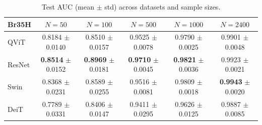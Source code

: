 \begin{table}[htbp]
\centering
\caption{Test AUC (mean $\pm$ std) across datasets and sample sizes.}
\label{tab:test_auc}
\begin{tabular}{lccccc}
\toprule
\textbf{Br35H} & $N = 50$ & $N = 100$ & $N = 500$ & $N = 1000$ & $N = 2400$ \\
\midrule
QViT & 0.8184 $\pm$ 0.0140 & 0.8510 $\pm$ 0.0157 & 0.9525 $\pm$ 0.0078 & 0.9790 $\pm$ 0.0025 & 0.9901 $\pm$ 0.0048 \\
ResNet & \textbf{0.8514} $\pm$ 0.0152 & \textbf{0.8969} $\pm$ 0.0181 & \textbf{0.9710} $\pm$ 0.0045 & \textbf{0.9821} $\pm$ 0.0036 & 0.9923 $\pm$ 0.0021 \\
Swin & 0.8368 $\pm$ 0.0231 & 0.8589 $\pm$ 0.0255 & 0.9516 $\pm$ 0.0081 & 0.9809 $\pm$ 0.0018 & \textbf{0.9943} $\pm$ 0.0020 \\
DeiT & 0.7789 $\pm$ 0.0331 & 0.8406 $\pm$ 0.0147 & 0.9411 $\pm$ 0.0295 & 0.9626 $\pm$ 0.0125 & 0.9887 $\pm$ 0.0085 \\
\bottomrule
\end{tabular}
\end{table}
